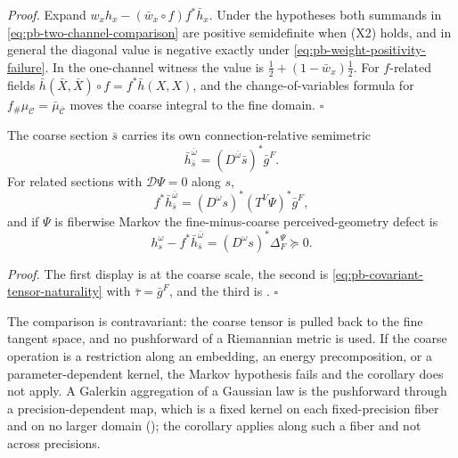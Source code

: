 \noindent\emph{Proof.}
Expand \(w_xh_x-(\bar w_x\circ f)f^*\bar h_x\). Under the hypotheses both summands in
\eqref{eq:pb-two-channel-comparison} are positive semidefinite when (X2) holds, and in general the
diagonal value is negative exactly under \eqref{eq:pb-weight-positivity-failure}. In the one-channel
witness the value is \(\tfrac12+(1-\bar w_x)\tfrac12\). For \(f\)-related fields
\(\bar h(\bar X,\bar X)\circ f=f^*\bar h(X,X)\), and the change-of-variables formula for
\(f_\#\mu_{\mathcal C}=\bar\mu_{\bar{\mathcal C}}\) moves the coarse integral to the fine domain.
\hfill$\square$

The coarse section \(\bar s\) carries its own connection-relative semimetric
\begin{equation}
\bar h_{\bar s}^{\bar\omega}
=(D^{\bar\omega}\bar s)^*\bar g^F.
\label{eq:pb-meta-perceived-geometry}
\end{equation}
For related sections with \(\mathcal D\Psi=0\) along \(s\),
\begin{equation}
f^*\bar h_{\bar s}^{\bar\omega}
=(D^\omega s)^*(T^V\Psi)^*\bar g^F,
\label{eq:pb-meta-perceived-naturality}
\end{equation}
and if \(\Psi\) is fiberwise Markov the fine-minus-coarse perceived-geometry defect is
\begin{equation}
h_s^\omega-f^*\bar h_{\bar s}^{\bar\omega}
=(D^\omega s)^*\Delta_F^\Psi\succeq0.
\label{eq:pb-meta-perceived-defect}
\end{equation}

\noindent\emph{Proof.}
The first display is  at the coarse scale, the second is
\eqref{eq:pb-covariant-tensor-naturality} with \(\bar\tau=\bar g^F\), and the third is
. \hfill$\square$

The comparison is contravariant: the coarse tensor is pulled back to the fine tangent space, and no
pushforward of a Riemannian metric is used. If the coarse operation is a restriction along an
embedding, an energy precomposition, or a parameter-dependent kernel, the Markov hypothesis fails and
the corollary does not apply. A Galerkin aggregation of a Gaussian law is the pushforward through a
precision-dependent map, which is a fixed kernel on each fixed-precision fiber and on no larger domain
(); the corollary applies along such a fiber and not across
precisions.

